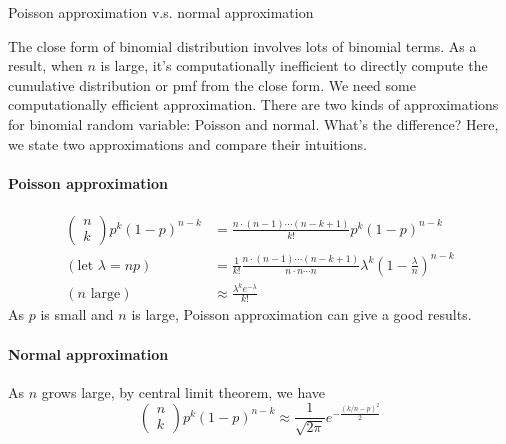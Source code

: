 \documentclass[../Transformation.tex]{subfiles}
\begin{document}
\begin{remark}{Poisson approximation v.s. normal approximation}

The close form of binomial distribution involves lots of binomial terms. As a result, when $n$ is large, it's computationally inefficient to directly compute the cumulative distribution or pmf from the close form. We need some computationally efficient approximation.
There are two kinds of approximations for binomial random variable: Poisson and normal. What's the difference? Here, we state two approximations and compare their intuitions.
\paragraph{Poisson approximation}
\begin{align*}
\left(\begin{array}{c}
n\\
k
\end{array}\right)p^k(1-p)^{n-k} &= \frac{n\cdot(n-1)\cdots(n-k+1)}{k!}p^k(1-p)^{n-k}\\
(\mbox{let $\lambda=np$})&=\frac{1}{k!}\frac{n\cdot(n-1)\cdots(n-k+1)}{n\cdot n\cdots n}\lambda^k(1-\frac{\lambda}{n})^{n-k}\\
(\mbox{$n$ large})&\approx \frac{\lambda^ke^{-\lambda}}{k!}
\end{align*}
As $p$ is small and $n$ is large, Poisson approximation can give a good results.
\paragraph{Normal approximation}
As $n$ grows large, by central limit theorem, we have
$$\left(\begin{array}{c}
n\\
k
\end{array}\right)p^k(1-p)^{n-k}\approx\frac{1}{\sqrt{2\pi}}e^{-\frac{(k/n-p)^2}{2}}$$
\end{remark}
\end{document}
